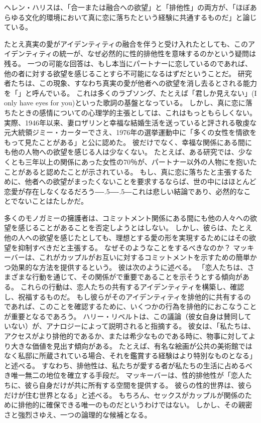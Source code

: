 \documentclass[paper=a4,book,openany]{jlreq}
\newcommand{\ig}[1]{}           %
\def\DDASH{―\kern-.5\zw―\kern-.5\zw―} %
\begin{document}
ヘレン・ハリス\ig{Helen Harris}は、「合一または融合への欲望」と「排他性」の両方が、「ほぼあらゆる文化的環境において真に恋に落ちたという経験に共通するものだ」と論じている\citep[pp.102--103]{harris95:_rethin_polyn_heter_relat}。

たとえ真実の愛がアイデンティティの融合を伴うと受け入れたとしても、このアイデンティティの統一が、なぜ必然的に性的排他性を意味するのかという疑問は残る。
一つの可能な回答は、もし本当にパートナーに恋しているのであれば、他の者に対する欲望を感じることすら不可能になるはずだということだ。
研究者たちは、この現象、すなわち真実の愛が他者への欲望を消し去るとされる能力を「」と呼んでいる。
これは多くのラブソング、たとえば「君しか見えない」(I only have eyes for you)といった歌詞の基盤となっている。
しかし、真に恋に落ちたときの感情についての心理学的主張としては、これはもっともらしくない。
実際、1946年以来、妻ロザリンと幸福な結婚生活を送っていると評される敬虔な元大統領ジミー・カーターでさえ、1976年の選挙運動中に「多くの女性を情欲をもって見たことがある」と公に認めた。
彼だけでなく、幸福な関係にある間にも他の人物への欲望を感じる人は少なくない。
たとえば、ある研究では、少なくとも三年以上の関係にあった女性の70％が、パートナー以外の人物にを抱いたことがあると認めたことが示されている\citep{barnhart16:_women_exper_feelin_attrac_someon}。
もし、真に恋に落ちたと主張するために、他者への欲望がまったくないことを要求するならば、世の中にはほとんど恋愛が存在しなくなるだろう{\DDASH}これは悲しい結論であり、必然的なことでないことはたしかだ。

多くのモノガミーの擁護者は、コミットメント関係にある間にも他の人々への欲望を感じることがあることを否定しようとはしない。
しかし、彼らは、たとえ他の人への欲望を感じたとしても、理想とする愛の形を実現するためにはその欲望を抑制すべきだと主張する。
なぜそのようなことをするべきなのか？ マッキーバーは、これがカップルがお互いに対するコミットメントを示すための簡単かつ効果的な方法を提供するという。
彼は次のように述べる。
「恋人たちは、さまざまな行動を通じて、その関係がで重要であることを示そうとする傾向がある。
これらの行動は、恋人たちの共有するアイデンティティを構築し、確認し、祝福するものだ。
もし彼らがそのアイデンティティを排他的に共有するのであれば、このことを確認するために、いくつかの行為を排他的におこなうことが重要となるであろう\citep[p.361]{mckeever17:_is_requir_sexual_exclus_consis_roman_love}。
ハリー・リベルトは、この議論（彼女自身は賛同していない）が、アナロジーによって説明されると指摘する。
彼女は、「私たちは、アクセスがより排他的であるか、または希少なものである時に、物事に対してより大きな価値を見出す傾向がある。
たとえば、有名な絵画が公共の美術館ではなく私邸に所蔵されている場合、それを鑑賞する経験はより特別なものとなる」と述べる\citep[p.410]{liberto17:_prob_sexual_prom}。
すなわち、排他性は、私たちが愛する者が私たちの生活に占めるべき唯一無二の地位を確立する手段だ。
マッキーバーは、性的排他性が「恋人たちに、彼ら自身だけが共に所有する空間を提供する。
彼らの性的世界は、彼らだけが住む世界となる」と述べる\citep[p.61]{mckeever17:_is_requir_sexual_exclus_consis_roman_love}。
もちろん、セックスがカップルが関係のために排他的に確保できる唯一のものだというわけではない。
しかし、その親密さと強烈さゆえ、一つの論理的な候補となる\citep[p.6]{york19:_why_monog_is_moral_permis}。
\end{document}
